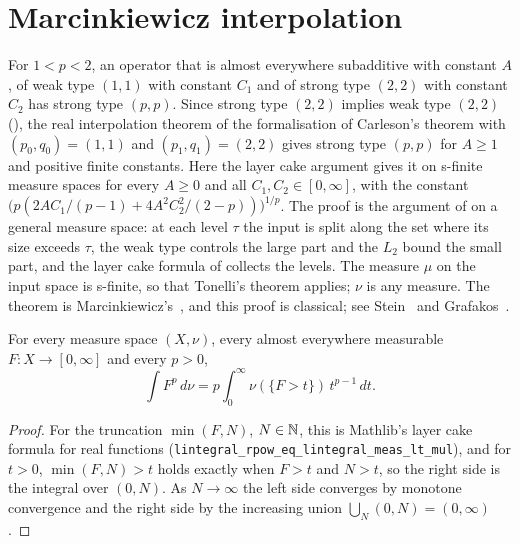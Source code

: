 \section{Marcinkiewicz interpolation}
\label{sec:marcinkiewicz}

For $1 < p < 2$, an operator that is almost everywhere subadditive with constant $A$, of weak
type $(1,1)$ with constant $C_1$ and of strong type $(2,2)$ with constant $C_2$ has strong type
$(p, p)$. Since strong type $(2,2)$ implies weak type $(2,2)$
(), the real interpolation theorem of the formalisation
of Carleson's theorem \cite{CarlesonLean} with $(p_0, q_0) = (1, 1)$ and
$(p_1, q_1) = (2, 2)$ gives strong type $(p, p)$ for $A \geq 1$ and positive finite constants.
Here the layer cake argument gives it on s-finite measure spaces for every $A \geq 0$ and all
$C_1, C_2 \in [0, \infty]$, with the constant
$\bigl(p (2 A C_1/(p - 1) + 4 A^2 C_2^2/(2 - p))\bigr)^{1/p}$. The proof is the argument of
 on a general measure space: at each level $\tau$ the
input is split along the set where its size exceeds $\tau$, the weak type controls the large
part and the $L_2$ bound the small part, and the layer cake formula of 
collects the levels. The measure $\mu$ on the input space is s-finite, so that Tonelli's theorem
applies; $\nu$ is any measure. The theorem is Marcinkiewicz's~\cite{Marcinkiewicz1939}, and
this proof is classical; see Stein~\cite{SteinSingular} and Grafakos~\cite{Grafakos}.

\begin{lemma}
\label{lem:layer-cake}
\leanok
For every measure space $(X, \nu)$, every almost everywhere measurable
$F : X \to [0, \infty]$ and every $p > 0$,
\[
  \int F^p \, d\nu = p \int_0^\infty \nu(\{F > t\}) \, t^{p-1} \, dt .
\]
\end{lemma}

\begin{proof}
\leanok
For the truncation $\min(F, N)$, $N \in \mathbb{N}$, this is Mathlib's layer cake formula for real
functions (\texttt{lintegral\_rpow\_eq\_lintegral\_meas\_lt\_mul}), and for $t > 0$,
$\min(F, N) > t$ holds exactly when $F > t$ and $N > t$, so the right side is the integral
over $(0, N)$. As $N \to \infty$ the left side converges by monotone convergence and the right
side by the increasing union $\bigcup_N (0, N) = (0, \infty)$.
\end{proof}

